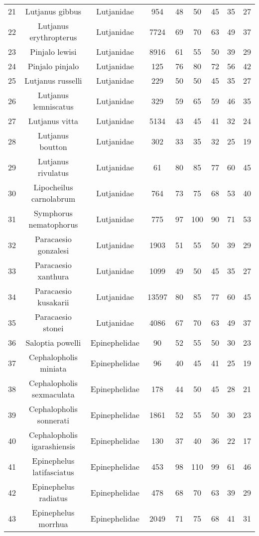 \documentclass{report}\usepackage[]{graphicx}\usepackage[]{color}
\begin{document}
{\begin{longtable}{ccccccccc}
  21 & Lutjanus gibbus & Lutjanidae & 954 & 48 & 50 & 45 & 35 & 27 \\ 
  22 & Lutjanus erythropterus & Lutjanidae & 7724 & 69 & 70 & 63 & 49 & 37 \\ 
  23 & Pinjalo lewisi & Lutjanidae & 8916 & 61 & 55 & 50 & 39 & 29 \\ 
  24 & Pinjalo pinjalo & Lutjanidae & 125 & 76 & 80 & 72 & 56 & 42 \\ 
  25 & Lutjanus russelli & Lutjanidae & 229 & 50 & 50 & 45 & 35 & 27 \\ 
  26 & Lutjanus lemniscatus & Lutjanidae & 329 & 59 & 65 & 59 & 46 & 35 \\ 
  27 & Lutjanus vitta & Lutjanidae & 5134 & 43 & 45 & 41 & 32 & 24 \\ 
  28 & Lutjanus boutton & Lutjanidae & 302 & 33 & 35 & 32 & 25 & 19 \\ 
  29 & Lutjanus rivulatus & Lutjanidae & 61 & 80 & 85 & 77 & 60 & 45 \\ 
  30 & Lipocheilus carnolabrum & Lutjanidae & 764 & 73 & 75 & 68 & 53 & 40 \\ 
  31 & Symphorus nematophorus & Lutjanidae & 775 & 97 & 100 & 90 & 71 & 53 \\ 
  32 & Paracaesio gonzalesi & Lutjanidae & 1903 & 51 & 55 & 50 & 39 & 29 \\ 
  33 & Paracaesio xanthura & Lutjanidae & 1099 & 49 & 50 & 45 & 35 & 27 \\ 
  34 & Paracaesio kusakarii & Lutjanidae & 13597 & 80 & 85 & 77 & 60 & 45 \\ 
  35 & Paracaesio stonei & Lutjanidae & 4086 & 67 & 70 & 63 & 49 & 37 \\ 
  36 & Saloptia powelli & Epinephelidae & 90 & 52 & 55 & 50 & 30 & 23 \\ 
  37 & Cephalopholis miniata & Epinephelidae & 96 & 40 & 45 & 41 & 25 & 19 \\ 
  38 & Cephalopholis sexmaculata & Epinephelidae & 178 & 44 & 50 & 45 & 28 & 21 \\ 
  39 & Cephalopholis sonnerati & Epinephelidae & 1861 & 52 & 55 & 50 & 30 & 23 \\ 
  40 & Cephalopholis igarashiensis & Epinephelidae & 130 & 37 & 40 & 36 & 22 & 17 \\ 
  41 & Epinephelus latifasciatus & Epinephelidae & 453 & 98 & 110 & 99 & 61 & 46 \\ 
  42 & Epinephelus radiatus & Epinephelidae & 478 & 68 & 70 & 63 & 39 & 29 \\ 
  43 & Epinephelus morrhua & Epinephelidae & 2049 & 71 & 75 & 68 & 41 & 31 \\ 

\end{longtable}}
\end{document}
